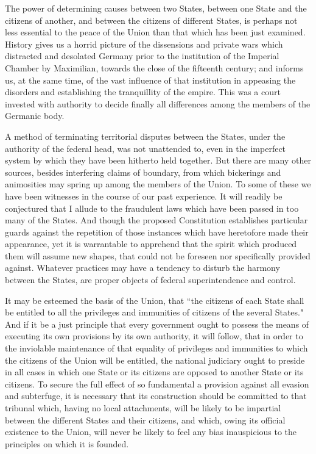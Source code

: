 The power of determining causes between two States, between one State and the citizens of another, and between the citizens of different States, is perhaps not less essential to the peace of the Union than that which has been just examined. 
History gives us a horrid picture of the dissensions and private wars which distracted and desolated Germany prior to the institution of the Imperial Chamber by Maximilian, towards the close of the fifteenth century; and informs us, at the same time, of the vast influence of that institution in appeasing the disorders and establishing the tranquillity of the empire. 
This was a court invested with authority to decide finally all differences among the members of the Germanic body.

A method of terminating territorial disputes between the States, under the authority of the federal head, was not unattended to, even in the imperfect system by which they have been hitherto held together. 
But there are many other sources, besides interfering claims of boundary, from which bickerings and animosities may spring up among the members of the Union. 
To some of these we have been witnesses in the course of our past experience. 
It will readily be conjectured that I allude to the fraudulent laws which have been passed in too many of the States. 
And though the proposed Constitution establishes particular guards against the repetition of those instances which have heretofore made their appearance, yet it is warrantable to apprehend that the spirit which produced them will assume new shapes, that could not be foreseen nor specifically provided against. 
Whatever practices may have a tendency to disturb the harmony between the States, are proper objects of federal superintendence and control.

It may be esteemed the basis of the Union, that ``the citizens of each State shall be entitled to all the privileges and immunities of citizens of the several States." And if it be a just principle that every government ought to possess the means of executing its own provisions by its own authority, it will follow, that in order to the inviolable maintenance of that equality of privileges and immunities to which the citizens of the Union will be entitled, the national judiciary ought to preside in all cases in which one State or its citizens are opposed to another State or its citizens. 
To secure the full effect of so fundamental a provision against all evasion and subterfuge, it is necessary that its construction should be committed to that tribunal which, having no local attachments, will be likely to be impartial between the different States and their citizens, and which, owing its official existence to the Union, will never be likely to feel any bias inauspicious to the principles on which it is founded.

